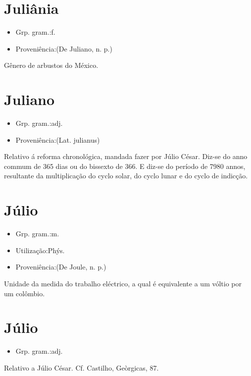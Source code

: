 \documentclass{article}
\begin{document}
\section{Juliânia}
\begin{itemize}
\item {Grp. gram.:f.}
\end{itemize}
\begin{itemize}
\item {Proveniência:(De \textunderscore Juliano\textunderscore , n. p.)}
\end{itemize}
Gênero de arbustos do México.
\section{Juliano}
\begin{itemize}
\item {Grp. gram.:adj.}
\end{itemize}
\begin{itemize}
\item {Proveniência:(Lat. \textunderscore julianus\textunderscore )}
\end{itemize}
Relativo á reforma chronológica, mandada fazer por Júlio César.
Diz-se do anno commum de 365 dias ou do bissexto de 366.
E diz-se do período de 7980 annos, resultante da multiplicação do cyclo solar, do cyclo lunar e do cyclo de indicção.
\section{Júlio}
\begin{itemize}
\item {Grp. gram.:m.}
\end{itemize}
\begin{itemize}
\item {Utilização:Phýs.}
\end{itemize}
\begin{itemize}
\item {Proveniência:(De \textunderscore Joule\textunderscore , n. p.)}
\end{itemize}
Unidade da medida do trabalho eléctrico, a qual é equivalente a um vóltio por um colômbio.
\section{Júlio}
\begin{itemize}
\item {Grp. gram.:adj.}
\end{itemize}
Relativo a Júlio César. Cf. Castilho, \textunderscore Geòrgicas\textunderscore , 87.
\end{document}

